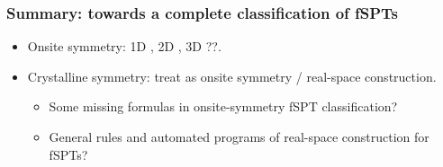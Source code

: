 \documentclass[xcolor=table, 11pt, aspectratio=1610]{beamer}
\begin{document}
\begin{frame}
\frametitle{Summary: towards a complete classification of fSPTs}
\begin{itemize}
\item Onsite symmetry: 1D , 2D , 3D ??.
\item Crystalline symmetry: treat as onsite symmetry / real-space construction.
  \begin{itemize}
  \item Some missing formulas in onsite-symmetry fSPT classification?
  \item General rules and automated programs of real-space construction for fSPTs?
  \end{itemize}
\end{itemize}
\end{frame}
\end{document}
